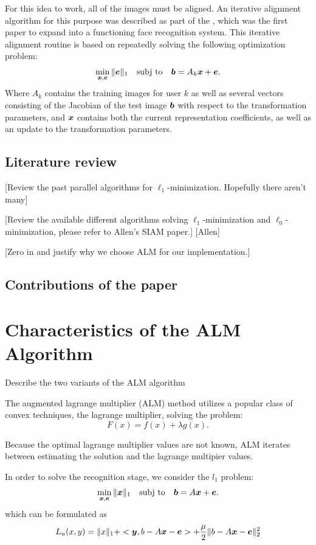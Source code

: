 \documentclass[10pt,twocolumn,letterpaper]{article}
\begin{document}
For this idea to work, all of the images must be aligned. An iterative alignment
algorithm for this purpose was described as part of the \cite{Wagner2009-CVPR}, which was
the first paper to expand \cite{Wright2009-PAMI} into a functioning face recognition system.
This iterative alignment routine is based on repeatedly solving the following optimization problem:
\begin{equation}
\min_{{\boldsymbol{x}}, \boldsymbol{e}} \|\boldsymbol{e}\|_1 \quad \textup{subj to} \quad \boldsymbol{b} = A_k {\boldsymbol{x}} + \boldsymbol{e}.
\end{equation}
Where $A_k$ contains the training images for user $k$ as well as several vectors consisting of the
Jacobian of the test image $\boldsymbol{b}$ with respect to the transformation parameters, and ${\boldsymbol{x}}$ contains
both the current representation coefficients, as well as an update to the transformation parameters.

\subsection{Literature review}
[Review the past parallel algorithms for $\ell_1$-minimization. Hopefully there aren't many]

[Review the available different algorithms solving $\ell_1$-minimization and $\ell_0$-minimization, please refer to Allen's SIAM paper.]
[Allen]

[Zero in and justify why we choose ALM for our implementation.]

\subsection{Contributions of the paper}

\section{Characteristics of the ALM Algorithm}
Describe the two variants of the ALM algorithm

The augmented lagrange multiplier (ALM) method utilizes a popular class of convex techniques, the lagrange multiplier, solving the problem:
\begin{equation}
F(x) = f(x) + \lambda g(x).
\end{equation}

Because the optimal lagrange multiplier values are not known, ALM iterates between estimating the solution and the lagrange multipier values.

In order to solve the recognition stage, we consider the $l_1$ problem:
\begin{equation}
\min_{{\boldsymbol{x}}, \boldsymbol{e}} \|{\boldsymbol{x}}\|_1 \quad \textup{subj to} \quad \boldsymbol{b} = A {\boldsymbol{x}} + \boldsymbol{e}.
\end{equation}
which can be formulated as
\begin{equation}
L_u(x,y) = \|x\|_1 + <\boldsymbol{y}, b - A{\boldsymbol{x}} - \boldsymbol{e}> + \frac{\mu}2 \| b-A{\boldsymbol{x}}-\boldsymbol{e} \|_2^2
\end{equation}
\end{document}
